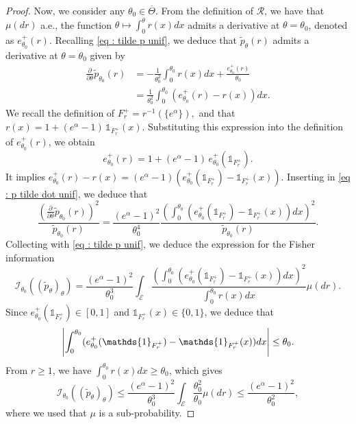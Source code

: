 \documentclass[10pt,a4paper]{amsart}
\DeclarePairedDelimiter{\abs}{\lvert}{\rvert}
\newcommand{\cE}{{\mathcal{E}}}
\newcommand{\cI}{{\mathcal{I}}}
\newcommand{\cR}{{\mathcal{R}}}
\newcommand{\indi}[1]{\mathds{1}_{#1}}
\begin{document}
\begin{proof}
Now, we consider any $\theta_0 \in \overline{\Theta}$. From the definition of $\cR$, we have that $\mu(dr)$ a.e., the function $\theta \mapsto \int_0^\theta r(x)dx$ admits a derivative at $\theta=\theta_0$, denoted as $e^+_{\theta_0}(r)$. Recalling \eqref{eq : tilde p unif}, we deduce that $\tilde{p}_\theta(r)$ admits a derivative at $\theta=\theta_0$ given by
\begin{align} \nonumber
	\frac{\partial}{\partial \theta} \tilde{p}_{\theta_0}(r)
	&= -\frac{1}{\theta_0^2}\int_0^{\theta_0} r(x)dx+\frac{e^+_{\theta_0}(r)}{\theta_0} 
	\\ \label{eq : p tilde dot unif}
	&= \frac{1}{\theta_0^2}\int_0^{\theta_0} (e^+_{\theta_0}(r)-r(x))dx.
\end{align}
We recall the definition of $F^+_r = r^{-1} \left( \{ e^\alpha \} \right),$
and that \( r(x) = 1 + (e^{\alpha} - 1) \, \indi{F^+_r}(x) \).  
Substituting this expression into the definition of \( e^+_{\theta_0}(r) \), we obtain  
\[
e^+_{\theta_0}(r) = 1 + (e^{\alpha} - 1) \, e^+_{\theta_0} \left( \indi{F^+_r} \right).
\]
It implies
$e^+_{\theta_0}(r)-r(x)=(e^{\alpha}-1)(e^+_{\theta_0}(\indi{F^+_r})-\indi{F^+_r}(x))$.
Inserting in \eqref{eq : p tilde dot unif}, we deduce that
\begin{equation*}
	\frac{(\frac{\partial}{\partial \theta} \tilde{p}_{\theta_0}(r))^2}{\tilde{p}_{\theta_0}(r)}
	=  \frac{(e^\alpha-1)^2}{\theta_0^4}\frac{\left( \int_0^{\theta_0} 
	(e^+_{\theta_0}(\indi{F^+_r})-\indi{F^+_r}(x))dx    \right)^2}{\widetilde{p}_{\theta_0}(r)}.
\end{equation*}
Collecting with  \eqref{eq : tilde p unif}, we deduce the expression for the Fisher information
\begin{equation*}
	\cI_{\theta_0}\left((\widetilde{p}_\theta)_\theta\right) 
	=	\frac{(e^\alpha-1)^2}{\theta_0^3}
	\int_{\cE}
\frac{\left( \int_0^{\theta_0} 
		(e^+_{\theta_0}(\indi{F^+_r})-\indi{F^+_r}(x))dx    \right)^2}{ \int_0^{\theta_0} r(x)dx } \mu(dr).
\end{equation*}	
	Since $e^+_{\theta_0}(\indi{F^+_r}) \in [0,1]$ and $\indi{F^+_r}(x)\in \{0,1\}$, we deduce that 
	\begin{equation} \label{eq : F_max unif}
	\abs*{ \int_0^{\theta_0} 
	(e^+_{\theta_0}(\indi{F^+_r})-\indi{F^+_r}(x))dx} \le \theta_0. 
	\end{equation}
	From $r\ge1$, we have $\int_0^{\theta_0} r(x)dx \ge \theta_0$, which gives
\begin{equation*}
	\cI_{\theta_0}\left((\widetilde{p}_\theta)_\theta\right) 
	\le	\frac{(e^\alpha-1)^2}{\theta_0^3}
	\int_{\cE} \frac{\theta_0^2}{\theta_0} \mu(dr) \le \frac{(e^\alpha-1)^2}{\theta_0^2},
\end{equation*}	
	where we used that $\mu$ is a sub-probability.	
\end{proof}
\end{document}
